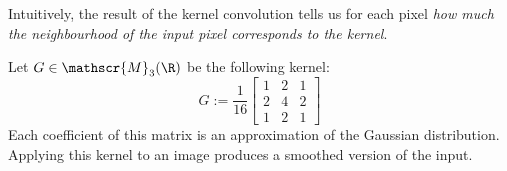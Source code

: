Intuitively, the result of the kernel convolution tells us for each pixel \emph{how much the neighbourhood of the input pixel corresponds to the kernel}.

\begin{example}
    Let $G\in\mathscr{M}_{3}(\R)$ be the following kernel:
    \begin{equation*}
        G := \frac{1}{16}\begin{bmatrix}
            1 & 2 & 1\\
            2 & 4 & 2\\
            1 & 2 & 1
        \end{bmatrix}
    \end{equation*}
    Each coefficient of this matrix is an approximation of the Gaussian distribution. Applying this kernel to an image produces a smoothed version of the input.
\end{example}


